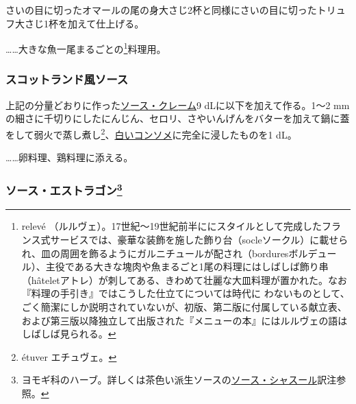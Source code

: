 \begin{recette}
さいの目に切ったオマールの尾の身大さじ2杯と同様にさいの目に切ったトリュフ大さじ1杯を加えて仕上げる。

\ldots{}\ldots{}大きな魚一尾まるごとの\footnote{relevé
  （ルルヴェ）。17世紀〜19世紀前半ににスタイルとして完成したフランス式サービスでは、豪華な装飾を施した飾り台（socleソークル）に載せられ、皿の周囲を飾るようにガルニチュールが配され（borduresボルデュール）、主役である大きな塊肉や魚まるごと1尾の料理にはしばしば飾り串（hâteletアトレ）が刺してある、きわめて壮麗な大皿料理が置かれた。なお『料理の手引き』ではこうした仕立てについては時代に
  わないものとして、ごく簡潔にしか説明されていないが、初版、第二版に付属している献立表、および第三版以降独立して出版された『メニューの本』にはルルヴェの語はしばしば見られる。}料理用。

\atoaki{}

\hypertarget{sauce-ecossaise}{%
\subsubsection{スコットランド風ソース}\label{sauce-ecossaise}}



上記の分量どおりに作った\protect\hyperlink{sauce-creme}{ソース・クレーム}9
dLに以下を加えて作る。1〜2
mmの細さに千切りにしたにんじん、セロリ、さやいんげんをバターを加えて鍋に蓋をして弱火で蒸し煮し\footnote{étuver
  エチュヴェ。}、\protect\hyperlink{}{白いコンソメ}に完全に浸したものを1
dL。

\noindent\ldots{}\ldots{}卵料理、鶏料理に添える。

\atoaki{}

\hypertarget{sauce-estragon-blanche}{%
\subsubsection[ソース・エストラゴン]{\texorpdfstring{ソース・エストラゴン\footnote{ヨモギ科のハーブ。詳しくは茶色い派生ソースの\protect\hyperlink{sauce-chasseur}{ソース・シャスール}訳注参照。}}{ソース・エストラゴン}}\label{sauce-estragon-blanche}}


 


\end{recette}
